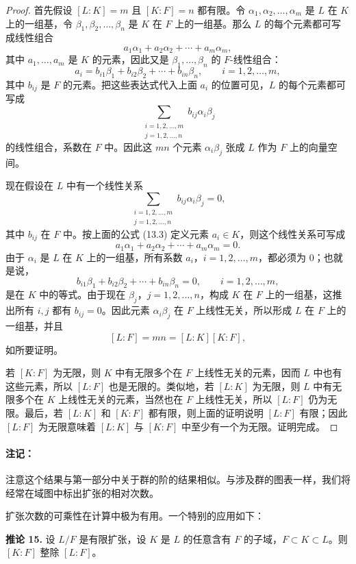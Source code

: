 \begin{proof}
	首先假设 $[L:K]=m$ 且 $[K:F]=n$ 都有限。令 $\alpha_1,\alpha_2,\ldots,\alpha_m$ 是 $L$ 在 $K$ 上的一组基，令 $\beta_1,\beta_2,\ldots,\beta_n$ 是 $K$ 在 $F$ 上的一组基。那么 $L$ 的每个元素都可写成线性组合
	\[
	a_1\alpha_1+a_2\alpha_2+\cdots+a_m\alpha_m,
	\]
	其中 $a_1,\ldots,a_m$ 是 $K$ 的元素，因此又是 $\beta_1,\ldots,\beta_n$ 的 $F$-线性组合：
	\[
	a_i=b_{i1}\beta_1+b_{i2}\beta_2+\cdots+b_{in}\beta_n,
	\qquad i=1,2,
	\ldots,m, \tag{13.3}
	\]
	其中 $b_{ij}$ 是 $F$ 的元素。把这些表达式代入上面 $a_i$ 的位置可见，$L$ 的每个元素都可写成
	\[
	\sum_{\substack{i=1,2,\ldots,m\\ j=1,2,\ldots,n}} b_{ij}\alpha_i\beta_j
	\]
	的线性组合，系数在 $F$ 中。因此这 $mn$ 个元素 $\alpha_i\beta_j$ 张成 $L$ 作为 $F$ 上的向量空间。
	
	现在假设在 $L$ 中有一个线性关系
	\[
	\sum_{\substack{i=1,2,\ldots,m\\ j=1,2,\ldots,n}} b_{ij}\alpha_i\beta_j=0,
	\]
	其中 $b_{ij}$ 在 $F$ 中。按上面的公式 (13.3) 定义元素 $a_i\in K$，则这个线性关系可写成
	\[
	a_1\alpha_1+a_2\alpha_2+\cdots+a_m\alpha_m=0.
	\]
	由于 $\alpha_i$ 是 $L$ 在 $K$ 上的一组基，所有系数 $a_i$，$i=1,2,\ldots,m$，都必须为 $0$；也就是说，
	\[
	b_{i1}\beta_1+b_{i2}\beta_2+\cdots+b_{in}\beta_n=0,
	\qquad i=1,2,\ldots,m,
	\]
	是在 $K$ 中的等式。由于现在 $\beta_j$，$j=1,2,\ldots,n$，构成 $K$ 在 $F$ 上的一组基，这推出所有 $i,j$ 都有 $b_{ij}=0$。因此元素 $\alpha_i\beta_j$ 在 $F$ 上线性无关，所以形成 $L$ 在 $F$ 上的一组基，并且
	\[
	[L:F]=mn=[L:K][K:F],
	\]
	如所要证明。
	
	若 $[K:F]$ 为无限，则 $K$ 中有无限多个在 $F$ 上线性无关的元素，因而 $L$ 中也有这些元素，所以 $[L:F]$ 也是无限的。类似地，若 $[L:K]$ 为无限，则 $L$ 中有无限多个在 $K$ 上线性无关的元素，当然也在 $F$ 上线性无关，所以 $[L:F]$ 仍为无限。最后，若 $[L:K]$ 和 $[K:F]$ 都有限，则上面的证明说明 $[L:F]$ 有限；因此 $[L:F]$ 为无限意味着 $[L:K]$ 与 $[K:F]$ 中至少有一个为无限。证明完成。
\end{proof}

\paragraph{注记：} 注意这个结果与第一部分中关于群的阶的结果相似。与涉及群的图表一样，我们将经常在域图中标出扩张的相对次数。

扩张次数的可乘性在计算中极为有用。一个特别的应用如下：

\noindent\textbf{推论 15.} 设 $L/F$ 是有限扩张，设 $K$ 是 $L$ 的任意含有 $F$ 的子域，$F\subset K\subset L$。则 $[K:F]$ 整除 $[L:F]$。

